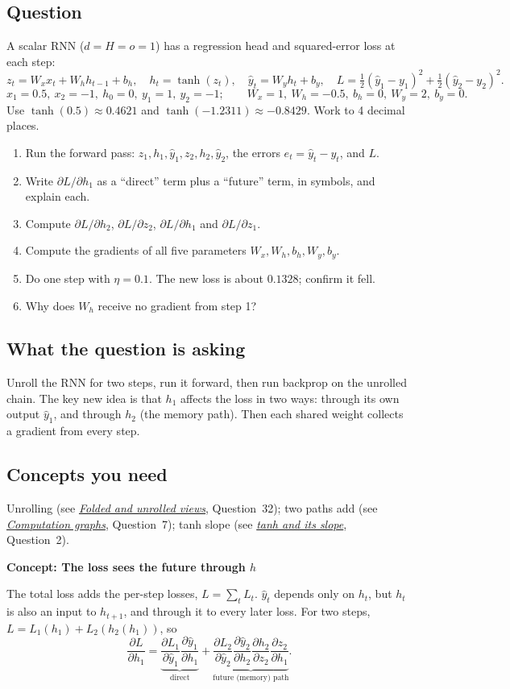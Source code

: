 \documentclass[12pt,a4paper]{article}
\newcommand{\concept}[2]{\par\medskip\phantomsection\label{#1}{\large\bfseries\color{blue!50!black} Concept: #2}\par}
\newcommand{\seeconcept}[3]{(see \hyperref[#1]{\textit{#2}}, Question~#3)}
\begin{document}
\subsection*{Question}
A scalar RNN ($d=H=o=1$) has a regression head and squared-error loss at each step:
\[
z_t=W_xx_t+W_hh_{t-1}+b_h,\quad h_t=\tanh(z_t),\quad \hat y_t=W_yh_t+b_y,\quad L=\tfrac12(\hat y_1-y_1)^2+\tfrac12(\hat y_2-y_2)^2 .
\]
\[
x_1=0.5,\ x_2=-1,\ h_0=0,\ y_1=1,\ y_2=-1;\qquad W_x=1,\ W_h=-0.5,\ b_h=0,\ W_y=2,\ b_y=0 .
\]
Use $\tanh(0.5)\approx0.4621$ and $\tanh(-1.2311)\approx-0.8429$. Work to 4 decimal places.
\begin{enumerate}[label=(\alph*)]
\item Run the forward pass: $z_1,h_1,\hat y_1,z_2,h_2,\hat y_2$, the errors $e_t=\hat y_t-y_t$, and $L$.
\item Write $\partial L/\partial h_1$ as a ``direct'' term plus a ``future'' term, in symbols, and explain each.
\item Compute $\partial L/\partial h_2$, $\partial L/\partial z_2$, $\partial L/\partial h_1$ and $\partial L/\partial z_1$.
\item Compute the gradients of all five parameters $W_x,W_h,b_h,W_y,b_y$.
\item Do one step with $\eta=0.1$. The new loss is about $0.1328$; confirm it fell.
\item Why does $W_h$ receive no gradient from step 1?
\end{enumerate}

\subsection*{What the question is asking}
Unroll the RNN for two steps, run it forward, then run backprop on the unrolled chain. The key new idea is that $h_1$ affects the loss in two ways: through its own output $\hat y_1$, and through $h_2$ (the memory path). Then each shared weight collects a gradient from every step.

\subsection*{Concepts you need}
Unrolling \seeconcept{c:unroll}{Folded and unrolled views}{32}; two paths add \seeconcept{c:graph}{Computation graphs}{7}; tanh slope \seeconcept{c:tanh}{tanh and its slope}{2}.

\concept{c:bpttpaths}{The loss sees the future through $h$}
The total loss adds the per-step losses, $L=\sum_tL_t$. $\hat y_t$ depends only on $h_t$, but $h_t$ is also an input to $h_{t+1}$, and through it to every later loss. For two steps, $L=L_1(h_1)+L_2(h_2(h_1))$, so
\[
\frac{\partial L}{\partial h_1}=\underbrace{\frac{\partial L_1}{\partial\hat y_1}\frac{\partial\hat y_1}{\partial h_1}}_{\text{direct}}+\underbrace{\frac{\partial L_2}{\partial\hat y_2}\frac{\partial\hat y_2}{\partial h_2}\frac{\partial h_2}{\partial z_2}\frac{\partial z_2}{\partial h_1}}_{\text{future (memory) path}}.
\]
\end{document}

